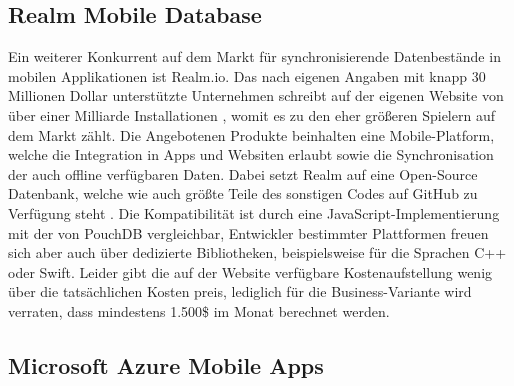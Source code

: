 \subsection{Realm Mobile Database}
Ein weiterer Konkurrent auf dem Markt für synchronisierende Datenbestände in mobilen Applikationen ist Realm.io. Das nach eigenen Angaben mit knapp 30 Millionen Dollar unterstützte Unternehmen schreibt auf der eigenen Website von über einer Milliarde Installationen \cite{realm:about}, womit es zu den eher größeren Spielern auf dem Markt zählt. Die Angebotenen Produkte beinhalten eine Mobile-Platform, welche die Integration in Apps und Websiten erlaubt sowie die Synchronisation der auch offline verfügbaren Daten. Dabei setzt Realm auf eine Open-Source Datenbank, welche wie auch größte Teile des sonstigen Codes auf GitHub zu Verfügung steht \cite{realm:githubrepo}. Die Kompatibilität ist durch eine JavaScript-Implementierung mit der von PouchDB vergleichbar, Entwickler bestimmter Plattformen freuen sich aber auch über dedizierte Bibliotheken, beispielsweise für die Sprachen C++ oder Swift. Leider gibt die auf der Website verfügbare Kostenaufstellung wenig über die tatsächlichen Kosten preis, lediglich für die Business-Variante wird verraten, dass mindestens 1.500\$ im Monat berechnet werden.

\subsection{Microsoft Azure Mobile Apps}
